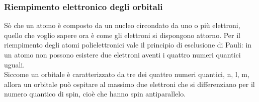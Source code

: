 \subsubsection{Riempimento elettronico degli orbitali}
Sò che un atomo è composto da un nucleo circondato da uno o più elettroni, quello che voglio sapere ora è come gli elettroni si dispongono attorno. 
Per il riempimento degli atomi polielettronici vale il principio di esclusione di Pauli: in un atomo non possono esistere due elettroni aventi i quattro numeri quantici uguali. \\
Siccome un orbitale è caratterizzato da tre dei quattro numeri quantici, n, l, m, allora un orbitale può ospitare al massimo due elettroni che si differenziano per il numero quantico di spin, cioè che hanno spin antiparallelo.
%
\begin{exbox}


\end{exbox}
